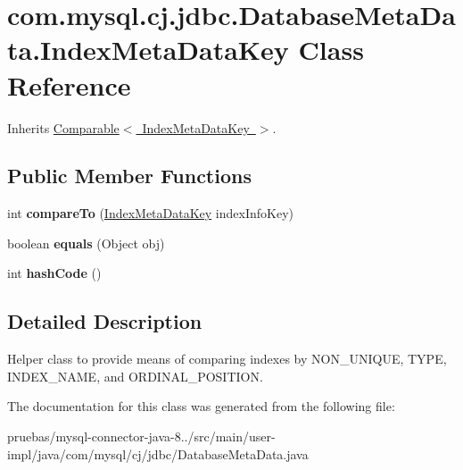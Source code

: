 \hypertarget{classcom_1_1mysql_1_1cj_1_1jdbc_1_1_database_meta_data_1_1_index_meta_data_key}{}\section{com.\+mysql.\+cj.\+jdbc.\+Database\+Meta\+Data.\+Index\+Meta\+Data\+Key Class Reference}
\label{classcom_1_1mysql_1_1cj_1_1jdbc_1_1_database_meta_data_1_1_index_meta_data_key}


Inherits \mbox{\hyperlink{class_comparable}{Comparable$<$ Index\+Meta\+Data\+Key $>$}}.

\subsection*{Public Member Functions}
\begin{DoxyCompactItemize}
\item 
\mbox{\label{classcom_1_1mysql_1_1cj_1_1jdbc_1_1_database_meta_data_1_1_index_meta_data_key_a4271d0bf2b328cd07bedb5aa35a84d2e}} 
int {\bfseries compare\+To} (\mbox{\hyperlink{classcom_1_1mysql_1_1cj_1_1jdbc_1_1_database_meta_data_1_1_index_meta_data_key}{Index\+Meta\+Data\+Key}} index\+Info\+Key)
\item 
\mbox{\label{classcom_1_1mysql_1_1cj_1_1jdbc_1_1_database_meta_data_1_1_index_meta_data_key_a6f39b445ccd5ebd23703172179164a50}} 
boolean {\bfseries equals} (Object obj)
\item 
\mbox{\label{classcom_1_1mysql_1_1cj_1_1jdbc_1_1_database_meta_data_1_1_index_meta_data_key_ae3059fb058d0cd9e17592a4a93d88c20}} 
int {\bfseries hash\+Code} ()
\end{DoxyCompactItemize}


\subsection{Detailed Description}
Helper class to provide means of comparing indexes by N\+O\+N\+\_\+\+U\+N\+I\+Q\+UE, T\+Y\+PE, I\+N\+D\+E\+X\+\_\+\+N\+A\+ME, and O\+R\+D\+I\+N\+A\+L\+\_\+\+P\+O\+S\+I\+T\+I\+ON. 

The documentation for this class was generated from the following file\+:\begin{DoxyCompactItemize}
\item 
pruebas/mysql-\/connector-\/java-\/8../src/main/user-\/impl/java/com/mysql/cj/jdbc/Database\+Meta\+Data.\+java\end{DoxyCompactItemize}
